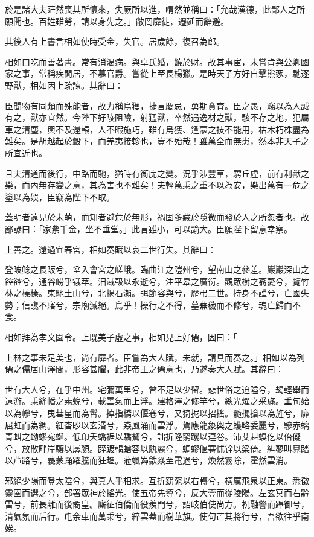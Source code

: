 \begin{pinyinscope}
於是諸大夫茫然喪其所懷來，失厥所以進，喟然並稱曰：「允哉漢德，此鄙人之所願聞也。百姓雖勞，請以身先之。」敞罔靡徙，遷延而辭避。

其後人有上書言相如使時受金，失官。居歲餘，復召為郎。

相如口吃而善著書。常有消渴病。與卓氏婚，饒於財。故其事宦，未嘗肯與公卿國家之事，常稱疾閒居，不慕官爵。嘗從上至長楊獵。是時天子方好自擊熊豕，馳逐野獸，相如因上疏諫。其辭曰：

臣聞物有同類而殊能者，故力稱烏獲，捷言慶忌，勇期賁育。臣之愚，竊以為人誠有之，獸亦宜然。今陛下好陵阻險，射猛獸，卒然遇逸材之獸，駭不存之地，犯屬車之清塵，輿不及還轅，人不暇施巧，雖有烏獲、逢蒙之技不能用，枯木朽株盡為難矣。是胡越起於轂下，而羌夷接軫也，豈不殆哉！雖萬全而無患，然本非天子之所宜近也。

且夫清道而後行，中路而馳，猶時有銜庑之變。況乎涉豐草，騁丘虛，前有利獸之樂，而內無存變之意，其為害也不難矣！夫輕萬乘之重不以為安，樂出萬有一危之塗以為娛，臣竊為陛下不取。

蓋明者遠見於未萌，而知者避危於無形，禍固多藏於隱微而發於人之所忽者也。故鄙諺曰：「家絫千金，坐不垂堂。」此言雖小，可以諭大。臣願陛下留意幸察。

上善之。還過宜春宮，相如奏賦以哀二世行失。其辭曰：

登陂鲶之長阪兮，坌入會宮之嵯峨。臨曲江之隑州兮，望南山之參差。巖巖深山之谾谾兮，通谷崂乎锇苹。汨淢靸以永逝兮，注平皋之廣衍。觀眾樹之蓊薆兮，覽竹林之榛榛。東馳土山兮，北揭石瀨。弭節容與兮，歷弔二世。持身不謹兮，亡國失勢；信讒不寤兮，宗廟滅絕。烏乎！操行之不得，墓蕪穢而不修兮，魂亡歸而不食。

相如拜為孝文園令。上既美子虛之事，相如見上好僊，因曰：「

上林之事未足美也，尚有靡者。臣嘗為大人賦，未就，請具而奏之。」相如以為列僊之儒居山澤間，形容甚臞，此非帝王之僊意也，乃遂奏大人賦。其辭曰：

世有大人兮，在乎中州。宅彌萬里兮，曾不足以少留。悲世俗之迫隘兮，朅輕舉而遠游。乘絳幡之素蜺兮，載雲氣而上浮。建格澤之修竿兮，總光燿之采旄。垂旬始以為幓兮，曳彗星而為髾。掉指橋以偃寋兮，又猗抳以招搖。髓攙搶以為旌兮，靡屈虹而為綢。紅杳眇以玄湣兮，猋風涌而雲浮。駕應龍象輿之蠖略委麗兮，驂赤螭青虯之蚴蟉宛蜒。低卬夭蟜裾以驕驁兮，詘折隆窮躩以連卷。沛艾赳螑仡以佁儗兮，放散畔岸驤以孱顏。跮踱輵螛容以骫麗兮，蜩蟉偃寋怵铨以梁倚。糾蓼叫奡踏以芦路兮，薎蒙踊躍騰而狂趭。蒞颯芔歙焱至電過兮，煥然霧除，霍然雲消。

邪絕少陽而登太陰兮，與真人乎相求。互折窈窕以右轉兮，橫厲飛泉以正東。悉徵靈圉而選之兮，部署眾神於搖光。使五帝先導兮，反大壹而從陵陽。左玄冥而右黔雷兮，前長離而後矞皇。廝征伯僑而役羨門兮，詔岐伯使尚方。祝融警而蹕御兮，清氣氛而后行。屯余車而萬乘兮，綷雲蓋而樹華旗。使句芒其將行兮，吾欲往乎南娭。


\end{pinyinscope}
